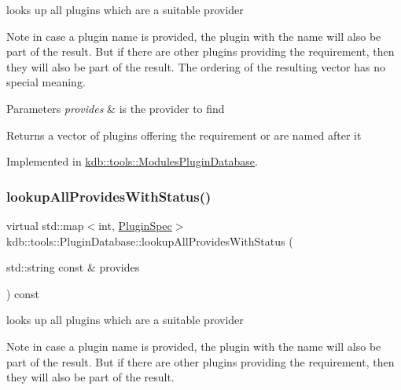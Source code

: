 looks up all plugins which are a suitable provider 

\begin{DoxyNote}{Note}
in case a plugin name is provided, the plugin with the name will also be part of the result. But if there are other plugins providing the requirement, then they will also be part of the result. The ordering of the resulting vector has no special meaning.
\end{DoxyNote}

\begin{DoxyParams}{Parameters}
{\em provides} & is the provider to find\\
\hline
\end{DoxyParams}
\begin{DoxyReturn}{Returns}
a vector of plugins offering the requirement or are named after it 
\end{DoxyReturn}


Implemented in \mbox{\hyperlink{classkdb_1_1tools_1_1ModulesPluginDatabase_a306384e88f9cf2874f6ba9ce28973a26}{kdb\+::tools\+::\+Modules\+Plugin\+Database}}.

\mbox{\label{classkdb_1_1tools_1_1PluginDatabase_aa918b547973f627a5604fa3b2b3faf30}} 
\subsubsection{\texorpdfstring{lookupAllProvidesWithStatus()}{lookupAllProvidesWithStatus()}}
{\footnotesize\ttfamily virtual std\+::map$<$int, \mbox{\hyperlink{classkdb_1_1tools_1_1PluginSpec}{Plugin\+Spec}}$>$ kdb\+::tools\+::\+Plugin\+Database\+::lookup\+All\+Provides\+With\+Status (\begin{DoxyParamCaption}\item[{std\+::string const \&}]{provides }\end{DoxyParamCaption}) const\hspace{0.3cm}{\ttfamily [pure virtual]}}



looks up all plugins which are a suitable provider 

\begin{DoxyNote}{Note}
in case a plugin name is provided, the plugin with the name will also be part of the result. But if there are other plugins providing the requirement, then they will also be part of the result.
\end{DoxyNote}

